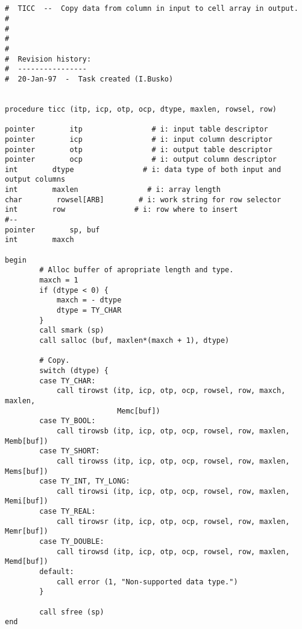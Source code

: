 \begin{verbatim}


#  TICC  --  Copy data from column in input to cell array in output.
#
#
#
#
#  Revision history:
#  ----------------
#  20-Jan-97  -  Task created (I.Busko)


procedure ticc (itp, icp, otp, ocp, dtype, maxlen, rowsel, row)

pointer        itp                # i: input table descriptor
pointer        icp                # i: input column descriptor
pointer        otp                # i: output table descriptor
pointer        ocp                # i: output column descriptor
int        dtype                # i: data type of both input and output columns
int        maxlen                # i: array length
char        rowsel[ARB]        # i: work string for row selector
int        row                # i: row where to insert
#--
pointer        sp, buf
int        maxch

begin
        # Alloc buffer of apropriate length and type. 
        maxch = 1
        if (dtype < 0) {
            maxch = - dtype
            dtype = TY_CHAR
        }
        call smark (sp)
        call salloc (buf, maxlen*(maxch + 1), dtype)

        # Copy.
        switch (dtype) {
        case TY_CHAR:
            call tirowst (itp, icp, otp, ocp, rowsel, row, maxch, maxlen, 
                          Memc[buf])
        case TY_BOOL:
            call tirowsb (itp, icp, otp, ocp, rowsel, row, maxlen, Memb[buf])
        case TY_SHORT:
            call tirowss (itp, icp, otp, ocp, rowsel, row, maxlen, Mems[buf])
        case TY_INT, TY_LONG:
            call tirowsi (itp, icp, otp, ocp, rowsel, row, maxlen, Memi[buf])
        case TY_REAL:
            call tirowsr (itp, icp, otp, ocp, rowsel, row, maxlen, Memr[buf])
        case TY_DOUBLE:
            call tirowsd (itp, icp, otp, ocp, rowsel, row, maxlen, Memd[buf])
        default:
            call error (1, "Non-supported data type.")
        }

        call sfree (sp)
end
\end{verbatim}
\newpage
{}
